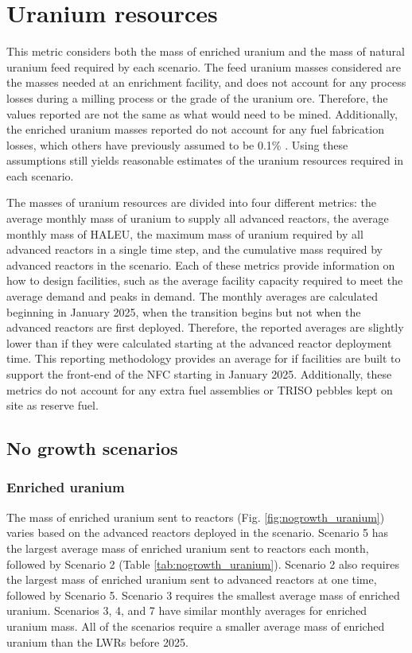 \section{Uranium resources}
This metric considers  
both the mass of enriched uranium and the mass of natural uranium feed 
required by each scenario. The feed uranium masses 
considered are the masses needed at an enrichment facility,
and does not account for any process losses during a milling process 
or the grade of the uranium ore. Therefore, the values reported are 
not the same as what would need to be mined. Additionally, the 
enriched uranium masses reported do not account for 
any fuel fabrication losses, which others have previously assumed to 
be 0.1\% \cite{wigeland_nuclear_2014}. Using these assumptions 
still yields reasonable estimates of the uranium resources 
required in each scenario. 

The masses of uranium resources are divided into four 
different metrics: the average monthly mass of uranium to supply all 
advanced reactors, the average monthly mass of \gls{HALEU}, the 
maximum mass of uranium required by all advanced 
reactors in a single time step, and the cumulative mass required by
advanced reactors in the 
scenario. Each of these metrics provide information 
on how to design facilities, such as the average facility capacity 
required to meet the average demand and peaks in demand. The monthly 
averages are calculated beginning in January 2025, 
when the transition begins but not when the advanced reactors 
are first deployed. Therefore, the reported averages are slightly lower 
than if they were calculated starting at the advanced reactor deployment 
time. This reporting methodology provides an average for if 
facilities are built to support the front-end of the \gls{NFC} starting 
in January 2025. Additionally, these metrics do not account for any 
extra fuel assemblies or \gls{TRISO} pebbles kept on site as 
reserve fuel. 

\subsection{No growth scenarios}
\subsubsection{Enriched uranium}
The mass of enriched uranium sent to reactors (Fig. \ref{fig:nogrowth_uranium})
varies based on the advanced reactors deployed in the scenario. 
Scenario 5 has the largest average mass of enriched uranium sent to 
reactors each month, followed by Scenario 2 (Table 
\ref{tab:nogrowth_uranium}). 
Scenario 2 also requires the largest mass of enriched uranium sent 
to advanced reactors at one time, followed by Scenario 5.
Scenario 3 requires the smallest average 
mass of enriched uranium. Scenarios 3, 4, and 7 
have similar monthly averages for enriched uranium mass. All of the 
scenarios require a smaller 
average mass of enriched uranium than the \glspl{LWR} before 2025. 

